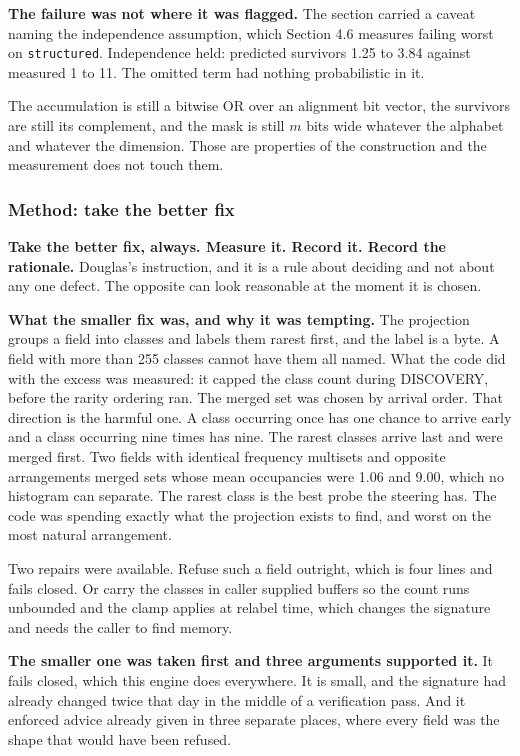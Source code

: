 \textbf{The failure was not where it was flagged.} The section carried a caveat naming the independence assumption, which Section 4.6 measures failing worst on \texttt{structured}. Independence held: predicted survivors 1.25 to 3.84 against measured 1 to 11. The omitted term had nothing probabilistic in it.

The accumulation is still a bitwise OR over an alignment bit vector, the survivors are still its complement, and the mask is still \(m\) bits wide whatever the alphabet and whatever the dimension. Those are properties of the construction and the measurement does not touch them.

\subsubsection{Method: take the better fix}

\textbf{Take the better fix, always. Measure it. Record it. Record the rationale.} Douglas's instruction, and it is a rule about deciding and not about any one defect. The opposite can look reasonable at the moment it is chosen.

\textbf{What the smaller fix was, and why it was tempting.} The projection groups a field into classes and labels them rarest first, and the label is a byte. A field with more than 255 classes cannot have them all named. What the code did with the excess was measured: it capped the class count during DISCOVERY, before the rarity ordering ran. The merged set was chosen by arrival order. That direction is the harmful one. A class occurring once has one chance to arrive early and a class occurring nine times has nine. The rarest classes arrive last and were merged first. Two fields with identical frequency multisets and opposite arrangements merged sets whose mean occupancies were 1.06 and 9.00, which no histogram can separate. The rarest class is the best probe the steering has. The code was spending exactly what the projection exists to find, and worst on the most natural arrangement.

Two repairs were available. Refuse such a field outright, which is four lines and fails closed. Or carry the classes in caller supplied buffers so the count runs unbounded and the clamp applies at relabel time, which changes the signature and needs the caller to find memory.

\textbf{The smaller one was taken first and three arguments supported it.} It fails closed, which this engine does everywhere. It is small, and the signature had already changed twice that day in the middle of a verification pass. And it enforced advice already given in three separate places, where every field was the shape that would have been refused.

